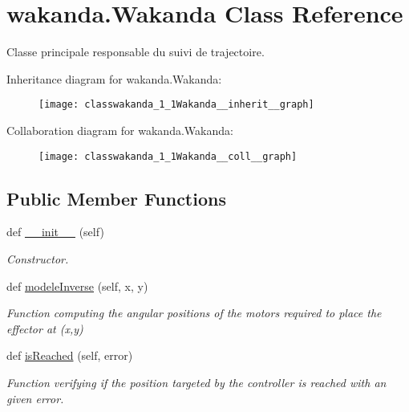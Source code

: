\hypertarget{classwakanda_1_1Wakanda}{}\section{wakanda.\+Wakanda Class Reference}
\label{classwakanda_1_1Wakanda}


Classe principale responsable du suivi de trajectoire.  




Inheritance diagram for wakanda.\+Wakanda\+:
\nopagebreak
\begin{figure}[H]
\begin{center}
\leavevmode
\texttt{[image: classwakanda\_1\_1Wakanda\_\_inherit\_\_graph]}
\end{center}
\end{figure}


Collaboration diagram for wakanda.\+Wakanda\+:
\nopagebreak
\begin{figure}[H]
\begin{center}
\leavevmode
\texttt{[image: classwakanda\_1\_1Wakanda\_\_coll\_\_graph]}
\end{center}
\end{figure}
\subsection*{Public Member Functions}
\begin{DoxyCompactItemize}
\item 
def \hyperlink{classwakanda_1_1Wakanda_a27ff7fb9ac3819931b93481588fb1e9f}{\+\_\+\+\_\+init\+\_\+\+\_\+} (self)\hypertarget{classwakanda_1_1Wakanda_a27ff7fb9ac3819931b93481588fb1e9f}{}\label{classwakanda_1_1Wakanda_a27ff7fb9ac3819931b93481588fb1e9f}

\begin{DoxyCompactList}\small\item\em Constructor. \end{DoxyCompactList}\item 
def \hyperlink{classwakanda_1_1Wakanda_a2240de179408dbc71c6892200cf5db1e}{modele\+Inverse} (self, x, y)
\begin{DoxyCompactList}\small\item\em Function computing the angular positions of the motors required to place the effector at (x,y) \end{DoxyCompactList}\item 
def \hyperlink{classwakanda_1_1Wakanda_a483ae1156569ce4c833611e5c688ed81}{is\+Reached} (self, error)
\begin{DoxyCompactList}\small\item\em Function verifying if the position targeted by the controller is reached with an given error. \end{DoxyCompactList}\end{DoxyCompactItemize}
